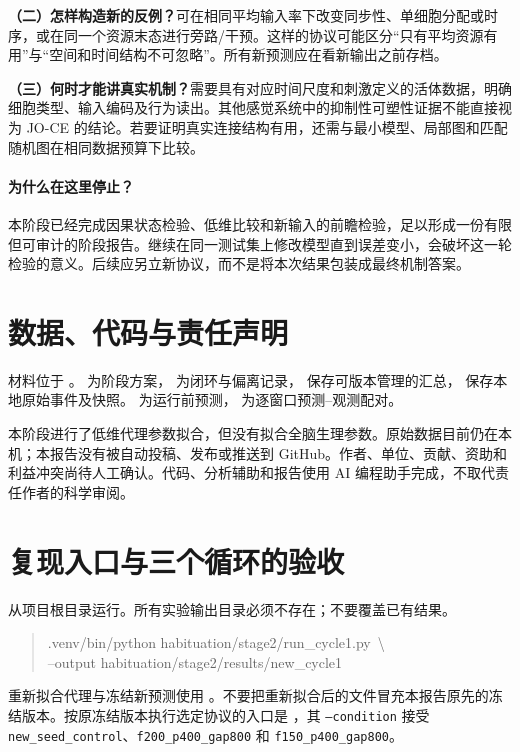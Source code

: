 \documentclass[UTF8,a4paper,zihao=-4,fontset=none]{ctexart}
\begin{document}
\textbf{（二）怎样构造新的反例？}可在相同平均输入率下改变同步性、单细胞分配或时序，或在同一个资源末态进行旁路/干预。这样的协议可能区分“只有平均资源有用”与“空间和时间结构不可忽略”。所有新预测应在看新输出之前存档。

\textbf{（三）何时才能讲真实机制？}需要具有对应时间尺度和刺激定义的活体数据，明确细胞类型、输入编码及行为读出。其他感觉系统中的抑制性可塑性证据不能直接视为 JO-CE 的结论。若要证明真实连接结构有用，还需与最小模型、局部图和匹配随机图在相同数据预算下比较。

\paragraph{为什么在这里停止？}
本阶段已经完成因果状态检验、低维比较和新输入的前瞻检验，足以形成一份有限但可审计的阶段报告。继续在同一测试集上修改模型直到误差变小，会破坏这一轮检验的意义。后续应另立新协议，而不是将本次结果包装成最终机制答案。

\section*{数据、代码与责任声明}
材料位于 。 为阶段方案， 为闭环与偏离记录， 保存可版本管理的汇总， 保存本地原始事件及快照。 为运行前预测， 为逐窗口预测--观测配对。

本阶段进行了低维代理参数拟合，但没有拟合全脑生理参数。原始数据目前仍在本机；本报告没有被自动投稿、发布或推送到 GitHub。作者、单位、贡献、资助和利益冲突尚待人工确认。代码、分析辅助和报告使用 AI 编程助手完成，不取代责任作者的科学审阅。

{\small\setlength{\bibsep}{3pt}\linespread{1.08}\selectfont
}
\clearpage
\appendix
\section{复现入口与三个循环的验收}
从项目根目录运行。所有实验输出目录必须不存在；不要覆盖已有结果。
\begin{quote}\footnotesize\ttfamily
.venv/bin/python habituation/stage2/run\_cycle1.py\ \textbackslash\\
\hspace*{1em}--output habituation/stage2/results/new\_cycle1
\end{quote}
重新拟合代理与冻结新预测使用 。不要把重新拟合后的文件冒充本报告原先的冻结版本。按原冻结版本执行选定协议的入口是 ，其 \texttt{--condition} 接受 \texttt{new\_seed\_control}、\texttt{f200\_p400\_gap800} 和 \texttt{f150\_p400\_gap800}。
\end{document}

